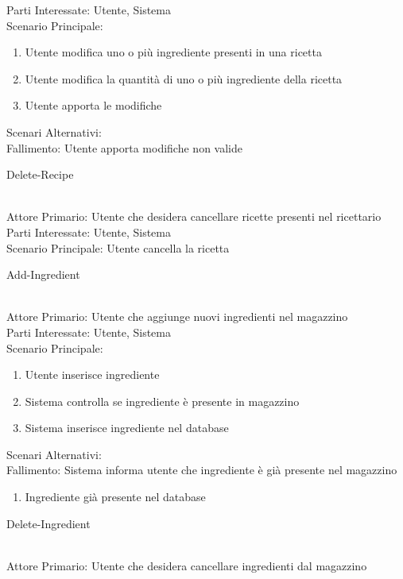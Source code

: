 \documentclass[12pt]{article}
\begin{document}
Parti Interessate: Utente, Sistema\\
Scenario Principale: 
\begin{enumerate}
\item Utente modifica uno o più ingrediente presenti in una ricetta
\item Utente modifica la quantità di uno o più ingrediente della ricetta
\item Utente apporta le modifiche
\end{enumerate}
Scenari Alternativi:\\
Fallimento: Utente apporta modifiche non valide
\bigskip
\\
\begin{itshape}
Delete-Recipe
\end{itshape}\\
Attore Primario: Utente che desidera cancellare ricette presenti nel ricettario\\
Parti Interessate: Utente, Sistema\\
Scenario Principale: Utente cancella la ricetta
\bigskip
\\
\begin{itshape}
Add-Ingredient
\end{itshape}\\
Attore Primario: Utente che aggiunge nuovi ingredienti nel magazzino\\
Parti Interessate: Utente, Sistema\\
Scenario Principale: \\
\begin{enumerate}
\item Utente inserisce ingrediente
\item Sistema controlla se ingrediente è presente in magazzino
\item Sistema inserisce ingrediente nel database
\end{enumerate}
Scenari Alternativi:\\
Fallimento: Sistema informa utente che ingrediente è già presente nel magazzino\\
\begin{enumerate}
\item Ingrediente già presente nel database
\end{enumerate}
\bigskip
\begin{itshape}
Delete-Ingredient
\end{itshape}\\
Attore Primario: Utente che desidera cancellare ingredienti dal magazzino\\
\end{document}
